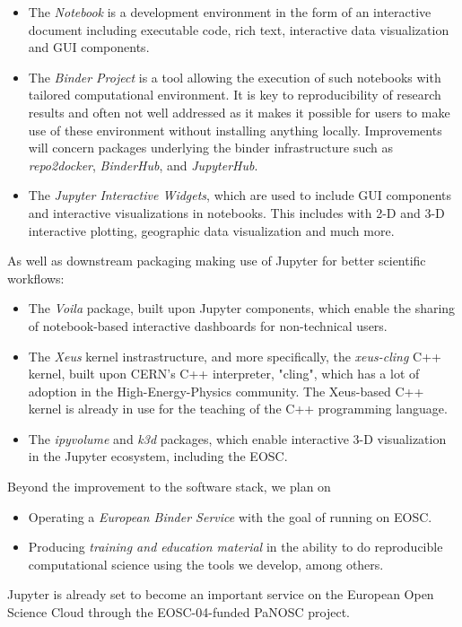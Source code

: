 \begin{itemize}
\item The \emph{Notebook} is a development environment in the form of an interactive document including executable code, rich text, interactive data visualization and GUI components.
\item The \emph{Binder Project} is a tool allowing the execution of such notebooks with tailored computational environment. It is key to reproducibility of research results and often not well addressed as it makes it possible for users to make use of these environment without installing anything locally. Improvements will concern packages underlying the binder infrastructure such as \emph{repo2docker}, \emph{BinderHub}, and \emph{JupyterHub}.
\item The \emph{Jupyter Interactive Widgets}, which are used to include GUI components and interactive visualizations in notebooks. This includes with 2-D and 3-D interactive plotting, geographic data visualization and much more.
\end{itemize}

As well as downstream packaging making use of Jupyter for better scientific workflows:

\begin{itemize}
\item The \emph{Voila} package, built upon Jupyter components, which enable the sharing of notebook-based interactive dashboards for non-technical users.
\item The \emph{Xeus} kernel instrastructure, and more specifically, the \emph{xeus-cling} C++ kernel, built upon CERN's C++ interpreter, "cling", which has a lot of adoption in the High-Energy-Physics community. The Xeus-based C++ kernel is already in use for the teaching of the C++ programming language.
\item The \emph{ipyvolume} and \emph{k3d} packages, which enable interactive 3-D visualization in the Jupyter ecosystem, including the EOSC.
\end{itemize}

Beyond the improvement to the software stack, we plan on 

\begin{itemize}
\item Operating a \emph{European Binder Service} with the goal of running on EOSC.
\item Producing \emph{training and education material} in the ability to do reproducible computational science using the tools we develop, among others.
\end{itemize}

Jupyter is already set to become an important service on the European Open Science Cloud through the EOSC-04-funded PaNOSC project.

\clearpage

